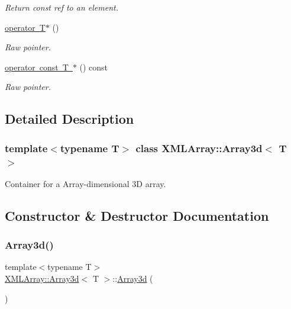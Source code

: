 \begin{DoxyCompactItemize}
\begin{DoxyCompactList}\small\item\em Return const ref to an element. \end{DoxyCompactList}\item 
\mbox{\hyperlink{classXMLArray_1_1Array3d_aec4e2efc011195e91a742b7fa33bbbdb}{operator T$\ast$}} ()
\begin{DoxyCompactList}\small\item\em Raw pointer. \end{DoxyCompactList}\item 
\mbox{\hyperlink{classXMLArray_1_1Array3d_a8eb9d716a0efb8d1ac737fcbef8dd50c}{operator const T $\ast$}} () const
\begin{DoxyCompactList}\small\item\em Raw pointer. \end{DoxyCompactList}\end{DoxyCompactItemize}


\subsection{Detailed Description}
\subsubsection*{template$<$typename T$>$\newline
class X\+M\+L\+Array\+::\+Array3d$<$ T $>$}

Container for a Array-\/dimensional 3D array. 

\subsection{Constructor \& Destructor Documentation}
\mbox{\label{classXMLArray_1_1Array3d_a05f33dbf6ca20ca7a16ec3e6d74f272b}} 
\subsubsection{\texorpdfstring{Array3d()}{Array3d()}\hspace{0.1cm}{\footnotesize\ttfamily [1/9]}}
{\footnotesize\ttfamily template$<$typename T$>$ \\
\mbox{\hyperlink{classXMLArray_1_1Array3d}{X\+M\+L\+Array\+::\+Array3d}}$<$ T $>$\+::\mbox{\hyperlink{classXMLArray_1_1Array3d}{Array3d}} (\begin{DoxyParamCaption}{ }\end{DoxyParamCaption})\hspace{0.3cm}{\ttfamily [inline]}}

